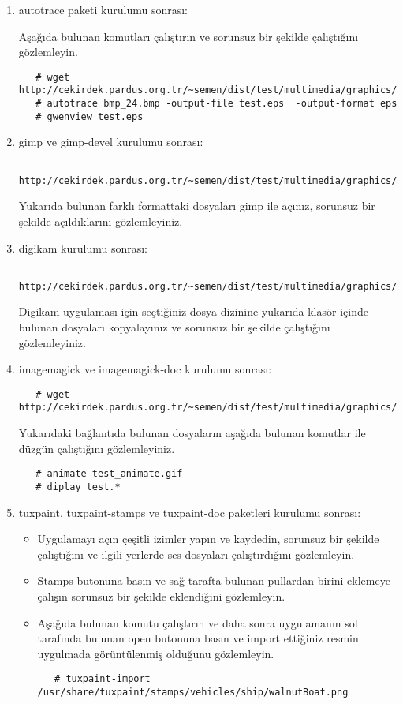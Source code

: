 \documentclass[a4paper,10pt]{article}
\begin{document}
\begin{enumerate}
\item autotrace paketi kurulumu sonrası:

Aşağıda bulunan komutları çalıştırın ve sorunsuz bir şekilde çalıştığını gözlemleyin.
  \begin{verbatim}
   # wget http://cekirdek.pardus.org.tr/~semen/dist/test/multimedia/graphics/bmp_24.bmp
   # autotrace bmp_24.bmp -output-file test.eps  -output-format eps
   # gwenview test.eps 
  \end{verbatim}

 \item gimp ve gimp-devel kurulumu sonrası:
  \begin{verbatim}
   http://cekirdek.pardus.org.tr/~semen/dist/test/multimedia/graphics/graphics.tar
  \end{verbatim}

 Yukarıda bulunan farklı formattaki dosyaları gimp ile açınız, sorunsuz bir şekilde açıldıklarını gözlemleyiniz.
\item digikam kurulumu sonrası:

  \begin{verbatim}
   http://cekirdek.pardus.org.tr/~semen/dist/test/multimedia/graphics/graphics.tar
  \end{verbatim}

 Digikam uygulaması için seçtiğiniz dosya dizinine yukarıda klasör içinde bulunan dosyaları kopyalayınız ve sorunsuz bir şekilde çalıştığını gözlemleyiniz.
\item imagemagick ve imagemagick-doc kurulumu sonrası:
  \begin{verbatim}
   # wget http://cekirdek.pardus.org.tr/~semen/dist/test/multimedia/graphics/graphics.tar
  \end{verbatim}

Yukarıdaki bağlantıda bulunan dosyaların aşağıda bulunan komutlar ile düzgün çalıştığını gözlemleyiniz.
  \begin{verbatim}
   # animate test_animate.gif
   # diplay test.*
  \end{verbatim}
\item tuxpaint, tuxpaint-stamps ve tuxpaint-doc paketleri kurulumu sonrası:
  \begin{itemize}
   \item  Uygulamayı açın çeşitli izimler yapın ve kaydedin, sorunsuz bir şekilde çalıştığını ve ilgili yerlerde ses dosyaları çalıştırdığını gözlemleyin.
   \item Stamps butonuna basın ve sağ tarafta bulunan pullardan birini eklemeye çalışın sorunsuz bir şekilde eklendiğini gözlemleyin.
   \item Aşağıda bulunan komutu çalıştırın ve daha sonra uygulamanın sol tarafında bulunan open butonuna basın ve import ettiğiniz resmin uygulmada görüntülenmiş olduğunu gözlemleyin.
\begin{verbatim}
   # tuxpaint-import /usr/share/tuxpaint/stamps/vehicles/ship/walnutBoat.png
\end{verbatim} 
\end{itemize}


\end{enumerate}
\end{document}

